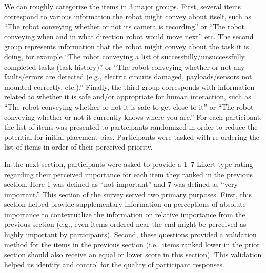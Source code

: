 \documentclass[letterpaper, 10 pt, conference]{ieeeconf}  %
\begin{document}
    We can roughly categorize the items in 3 major groups. First, several items correspond to various information the robot might convey about itself, such as ``The robot conveying whether or not its camera is recording'' or ``The robot conveying when and in what direction robot would move next'' etc. The second group represents information that the robot might convey about the task it is doing, for example ``The robot conveying a list of successfully/unsuccessfully completed tasks (task history)'' or ``The robot conveying whether or not any faults/errors are detected (e.g., electric circuits damaged, payloads/sensors not mounted correctly, etc.).'' Finally, the third group corresponds with information related to whether it is safe and/or appropriate for human interaction, such as ``The robot conveying whether or not it is safe to get close to it'' or ``The robot conveying whether or not it currently knows where you are.'' For each participant, the list of items was presented to participants randomized in order to reduce the potential for initial placement bias. Participants were tasked with re-ordering the list of items in order of their perceived priority. 
    
    In the next section, participants were asked to provide a 1--7 Likert-type rating regarding their perceived importance for each item they ranked in the previous section. Here 1 was defined as ``not important'' and 7 was defined as ``very important.'' This section of the survey served two primary purposes. First, this section helped provide supplementary information on perceptions of absolute importance to contextualize the information on relative importance from the previous section (e.g., even items ordered near the end might be perceived as highly important by participants). Second, these questions provided a validation method for the items in the previous section (i.e., items ranked lower in the prior section should also receive an equal or lower score in this section). This validation helped us identify and control for the quality of participant responses. %
\end{document}
